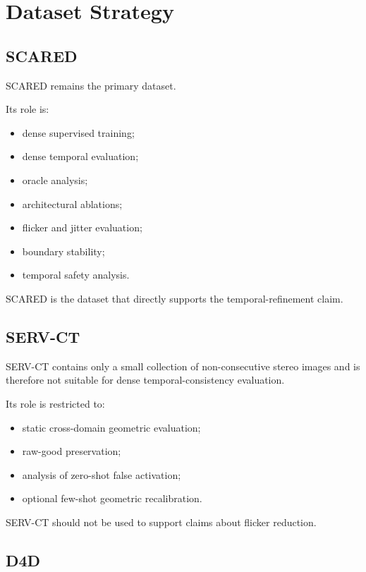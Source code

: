 \documentclass[11pt,a4paper]{article}
\begin{document}
\section{Dataset Strategy}

\subsection{SCARED}

SCARED remains the primary dataset.

Its role is:

\begin{itemize}[leftmargin=*]
    \item dense supervised training;
    \item dense temporal evaluation;
    \item oracle analysis;
    \item architectural ablations;
    \item flicker and jitter evaluation;
    \item boundary stability;
    \item temporal safety analysis.
\end{itemize}

SCARED is the dataset that directly supports the temporal-refinement claim.

\subsection{SERV-CT}

SERV-CT contains only a small collection of non-consecutive stereo images and is
therefore not suitable for dense temporal-consistency evaluation.

Its role is restricted to:

\begin{itemize}[leftmargin=*]
    \item static cross-domain geometric evaluation;
    \item raw-good preservation;
    \item analysis of zero-shot false activation;
    \item optional few-shot geometric recalibration.
\end{itemize}

SERV-CT should not be used to support claims about flicker reduction.

\subsection{D4D}
\end{document}
